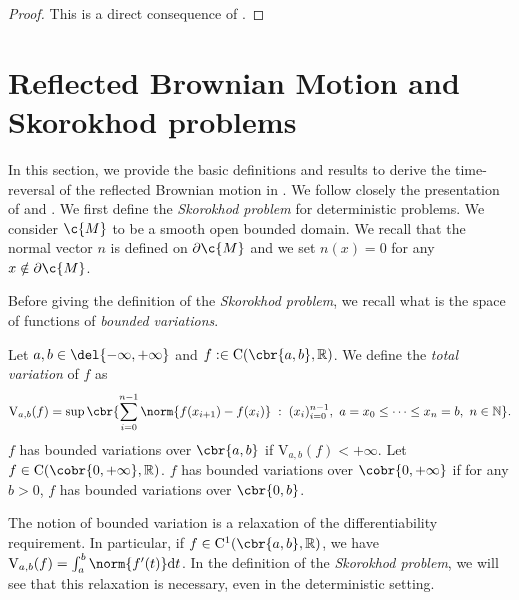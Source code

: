 \begin{proof}
	This is a direct consequence of \cite[Theorem 2.3.3]{nualart2006malliavin}.
\end{proof}

\section{Reflected Brownian Motion and Skorokhod problems}
\label{sec:refl-brown-moti}

In this section, we provide the basic definitions and results to derive the time-reversal of the reflected Brownian motion in .
We follow closely the presentation of \cite{lions1984stochastic} and \cite{burdzy2004heat}.
We first define the \emph{Skorokhod problem} for deterministic problems.
We consider \(\c{M}\) to be a smooth open bounded domain.
We recall that the normal vector \(n\) is defined on \(\partial \c{M}\) and we set \(n(x) = 0\) for any \(x \notin \partial \c{M}\).

Before giving the definition of the \emph{Skorokhod problem}, we recall what is the space of functions of \emph{bounded variations}.

\begin{definition}
	Let \(a, b \in \del{-\infty, +\infty}\) and \(f: \in \mathrm{C}(\cbr{a,b}, \R)\).
	We define the \emph{total variation} of \(f\) as \begin{equation}  \mathrm{V}_{a,b}(f) = \sup \cbr{\sum_{i=0}^{n-1} \norm{f(x_{i+1}) - f(x_i)} \; : \; (x_i)_{i=0}^{n-1}, \ a=x_0 \leq \dots \leq x_n = b, \ n \in \N} .
	\end{equation}
	\(f\) has bounded variations over \(\cbr{a,b}\) if
	\(\mathrm{V}_{a,b}(f) < +\infty\).
	Let \(f \in \mathrm{C}(\cobr{0,+\infty}, \R)\).
	\(f\) has bounded variations over \(\cobr{0,+\infty}\) if for any
	\(b>0\), \(f\) has bounded variations over \(\cbr{0,b}\).
\end{definition}

The notion of bounded variation is a relaxation of the differentiability requirement.
In particular, if \(f \in \mathrm{C}^1(\cbr{a,b}, \R)\), we have \(\mathrm{V}_{a,b}(f) = \int_a^b \norm{f'(t)} \mathrm{d} t\).
In the definition of the \emph{Skorokhod problem}, we will see that this relaxation is necessary, even in the deterministic setting.

